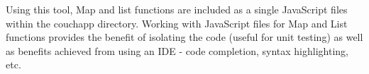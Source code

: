 Using this tool, Map and list functions are included as a single JavaScript files within the couchapp directory. Working with JavaScript files for Map and List functions provides the benefit of isolating the code (useful for unit testing) as well as benefits achieved from using an IDE - code completion, syntax highlighting, etc.